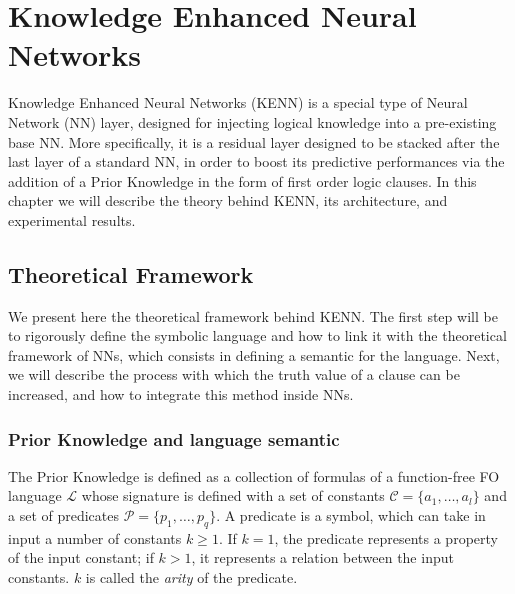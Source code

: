 
\chapter{Knowledge Enhanced Neural Networks}\label{chapt:kenn}
Knowledge Enhanced Neural Networks (KENN) \cite{daniele2019kenn} is a special type of Neural Network (NN) layer, designed for injecting logical knowledge into a pre-existing base NN. More specifically, it is a residual layer designed to be stacked after the last layer of a standard NN, in order to boost its predictive performances via the addition of a Prior Knowledge in the form of first order logic clauses. In this chapter we will describe the theory behind KENN, its architecture, and experimental results.

\section{Theoretical Framework}\label{sec:theoretical_framework}
 We present here the theoretical framework behind KENN. The first step will be to rigorously define the symbolic language and how to link it with the theoretical framework of NNs, which consists in defining a semantic for the language. Next, we will describe the process with which the truth value of a clause can be increased, and how to integrate this method inside NNs.
 
 \subsection{Prior Knowledge and language semantic}

\begin{definition}
	The Prior Knowledge is defined as a collection of formulas of a function-free FO language $\mathcal{L}$ whose signature is defined with a set of constants $\mathcal{C} = \{a_1, \dots, a_l\}$ and a set of predicates $\mathcal{P} = \{p_1, \dots, p_q\}$. 
	A predicate is a symbol, which can take in input a number of constants $k \geq 1$. If $k=1$, the predicate represents a property of the input constant; if $k>1$, it represents a relation between the input constants. $k$ is called the \textit{arity} of the predicate.
\end{definition}

